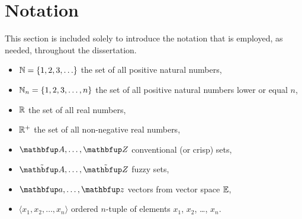 \section{Notation}
 This section is included solely to introduce the notation that is employed, as needed, throughout the dissertation.

\begin{itemize}
\item $\mathbb{N}=\left\{1,2,3,\ldots\right\}$ the set of all positive natural numbers,
\item $\mathbb{N}_n=\left\{1,2,3,\ldots,n\right\}$ the set of all positive natural numbers lower or equal $n$,
\item $\mathbb{R}$ the set of all real numbers,
\item $\mathbb{R}^+$ the set of all non-negative real numbers,
\item $\set{A},\ldots,\set{Z}$ conventional (or crisp) sets,
\item $\fset{A},\ldots,\fset{Z}$ fuzzy sets,
\item $\vect{a},\ldots,\vect{z}$ vectors from vector space $\mathbb{E}$,
\item $\langle x_1,x_2,\ldots,x_n \rangle$ ordered $n$-tuple of elements $x_1$, $x_2$, \ldots, $x_n$.
\end{itemize}

